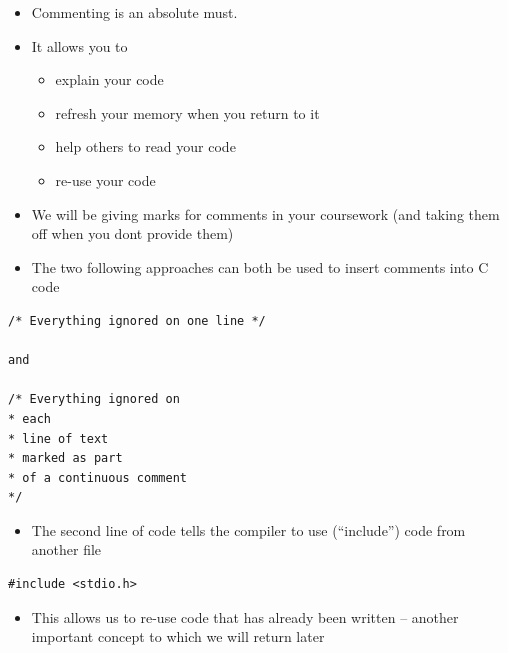 \documentclass{beamer}
\begin{document}
\begin{frame}
\begin{itemize}
\item Commenting is an absolute must.
\item It allows you to

\begin{itemize}
\item explain your code
\item refresh your memory when you return to it
\item help others to read your code
\item re-use your code
\end{itemize}
\item We will be giving marks for comments in your coursework (and taking them off when you dont provide them)
\end{itemize}

 

\end{frame} 

\begin{frame}[fragile]
 
\begin{itemize}
\item The two following approaches can both be used to insert comments into C code
\end{itemize}
 
\begin{block}{}
\begin{lstlisting}
/* Everything ignored on one line */ 

and

/* Everything ignored on
* each
* line of text
* marked as part
* of a continuous comment
*/
\end{lstlisting}
\end{block}

\end{frame}


\begin{frame}[fragile]
\begin{itemize}
\item The second line of code tells the compiler to use (``include'') code from another file 
\end{itemize}

\begin{block}{}
\begin{lstlisting}
#include <stdio.h>
\end{lstlisting}
\end{block}

\begin{itemize}
\item This allows us to re-use code that has already been written -- another important concept to which we will return later
\end{itemize}

\end{frame} 
\end{document}

